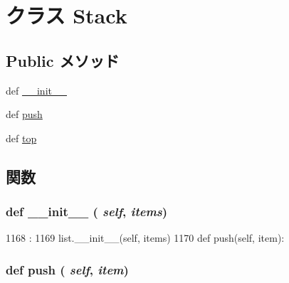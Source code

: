 \hypertarget{classisa__parser_1_1Stack}{
\section{クラス Stack}
\label{classisa__parser_1_1Stack}
}
\subsection*{Public メソッド}
\begin{DoxyCompactItemize}
\item 
def \hyperlink{classisa__parser_1_1Stack_ac775ee34451fdfa742b318538164070e}{\_\-\_\-init\_\-\_\-}
\item 
def \hyperlink{classisa__parser_1_1Stack_a95ed48a91131865e9003666504ab0257}{push}
\item 
def \hyperlink{classisa__parser_1_1Stack_a9ef5200066c676a2904e5745f8e00179}{top}
\end{DoxyCompactItemize}


\subsection{関数}
\hypertarget{classisa__parser_1_1Stack_ac775ee34451fdfa742b318538164070e}{
\subsubsection[{\_\-\_\-init\_\-\_\-}]{\setlength{\rightskip}{0pt plus 5cm}def \_\-\_\-init\_\-\_\- ( {\em self}, \/   {\em items})}}
\label{classisa__parser_1_1Stack_ac775ee34451fdfa742b318538164070e}



\begin{DoxyCode}
1168                               :
1169         list.__init__(self, items)
1170 
    def push(self, item):
\end{DoxyCode}
\hypertarget{classisa__parser_1_1Stack_a95ed48a91131865e9003666504ab0257}{
\subsubsection[{push}]{\setlength{\rightskip}{0pt plus 5cm}def push ( {\em self}, \/   {\em item})}}
\label{classisa__parser_1_1Stack_a95ed48a91131865e9003666504ab0257}



